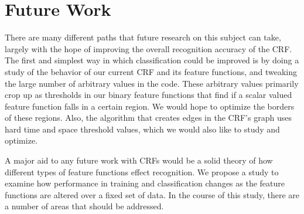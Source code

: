 \documentclass[10pt]{acmsiggraph}               %
\begin{document}
\section{Future Work}

There are many different paths that future research on this subject can take, largely with the hope
of improving the overall recognition accuracy of the CRF.  The first and simplest way
in which classification could be improved is by doing a study of the behavior of our current CRF and
its feature functions, and tweaking the large number of arbitrary values in the code.  These arbitrary values
primarily crop up as thresholds in our binary feature functions that find if a scalar valued feature function falls in a certain
region.  We would hope to optimize the borders of these regions.  Also, the
algorithm that creates edges in the CRF's graph uses hard time and space threshold values, which we would also
like to study and optimize.

A major aid to any future work with CRFs would be a solid theory of how different types of feature functions effect recognition.
We propose a study to examine how performance in training and classification changes as the feature functions
are altered over a fixed set of data.  In the course of this study, there are a number of areas that should be addressed.
\end{document}
